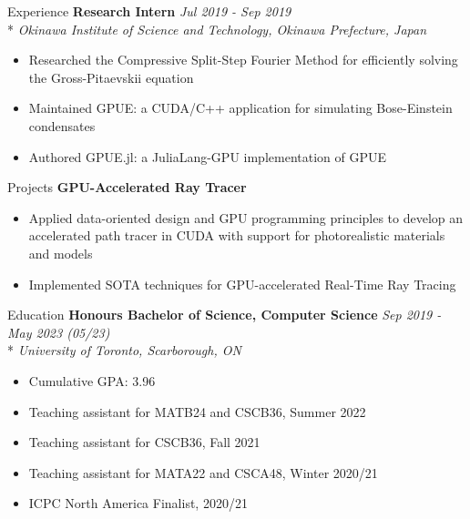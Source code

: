 \documentclass[11pt, letterpaper]{article}
\begin{document}
\begin{section}{Experience}
\textbf{Research Intern}
\hfill
\textit{Jul 2019 - Sep 2019}\\*
\textit{Okinawa Institute of Science and Technology, Okinawa Prefecture, Japan}
\begin{itemize}
  \item Researched the Compressive Split-Step Fourier Method for efficiently solving the Gross-Pitaevskii equation
  \item Maintained GPUE: a CUDA/C++ application for simulating Bose-Einstein condensates
  \item Authored GPUE.jl: a JuliaLang-GPU implementation of GPUE
\end{itemize}

\end{section}

\begin{section}{Projects}
\textbf{GPU-Accelerated Ray Tracer}
\begin{itemize}
  \item Applied data-oriented design and GPU programming principles to develop an accelerated path tracer in CUDA with support for photorealistic materials and models
  \item Implemented SOTA techniques for GPU-accelerated Real-Time Ray Tracing
\end{itemize}

\end{section}

\begin{section}{Education}
\textbf{Honours Bachelor of Science, Computer Science}
\hfill
\textit{Sep 2019 - May 2023 (05/23)}\\*
\textit{University of Toronto, Scarborough, ON}
\begin{itemize}
  \item Cumulative GPA: 3.96
  \item Teaching assistant for MATB24 and CSCB36, Summer 2022
  \item Teaching assistant for CSCB36, Fall 2021
  \item Teaching assistant for MATA22 and CSCA48, Winter 2020/21
  \item ICPC North America Finalist, 2020/21
\end{itemize}

\end{section}
\end{document}
